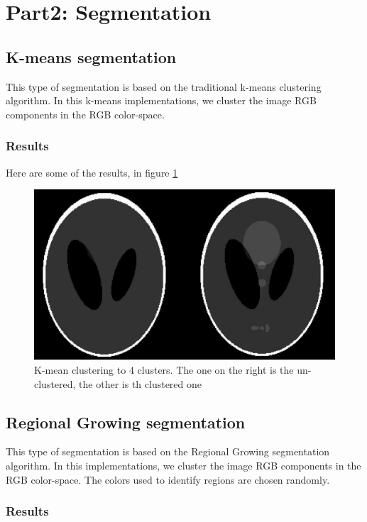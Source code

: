 \documentclass[letterpaper, 12 pt, conference ,onecolumn]{ieeeconf}  %
\begin{document}
\section{Part2: Segmentation}

\subsection*{K-means segmentation}
This type of segmentation is based on the traditional k-means clustering algorithm. In this k-means implementations, we cluster the image RGB components in the RGB color-space. 

\subsubsection*{\textbf{Results}}  

Here are some of the results, in figure \ref{fig:Xray-kmean-4}
\begin{figure}[h!]
\includegraphics[width=0.4\paperwidth]{kmeans/kmean-4}
\centering
\caption{K-mean clustering to 4 clusters. The one on the right is the un-clustered, the other is th clustered one}
\label{fig:Xray-kmean-4}
\end{figure}

\subsection*{Regional Growing segmentation}
This type of segmentation is based on the Regional Growing segmentation algorithm. In this  implementations, we cluster the image RGB components in the RGB color-space. The colors used to identify regions are chosen randomly.

\subsubsection*{\textbf{Results}}  
\end{document}
